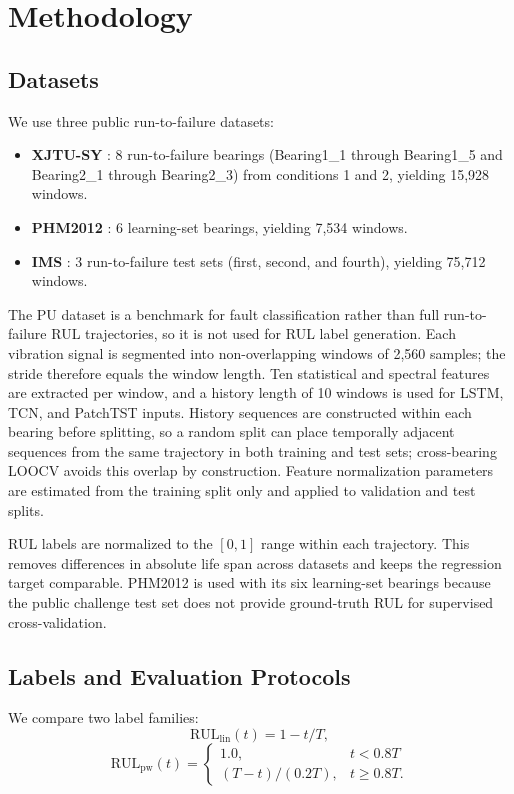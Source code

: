 \documentclass[pdflatex,sn-mathphys-num]{sn-jnl}
\begin{document}
\section{Methodology}
\subsection{Datasets}
We use three public run-to-failure datasets:
\begin{itemize}
    \item \textbf{XJTU-SY} \cite{xjtusy2019dataset}: 8 run-to-failure bearings (Bearing1\_1 through Bearing1\_5 and Bearing2\_1 through Bearing2\_3) from conditions 1 and 2, yielding 15,928 windows.
    \item \textbf{PHM2012} \cite{nectoux2012pronostia}: 6 learning-set bearings, yielding 7,534 windows.
    \item \textbf{IMS} \cite{ims2006}: 3 run-to-failure test sets (first, second, and fourth), yielding 75,712 windows.
\end{itemize}
The PU dataset is a benchmark for fault classification rather than full run-to-failure RUL trajectories, so it is not used for RUL label generation. Each vibration signal is segmented into non-overlapping windows of 2,560 samples; the stride therefore equals the window length. Ten statistical and spectral features are extracted per window, and a history length of 10 windows is used for LSTM, TCN, and PatchTST inputs. History sequences are constructed within each bearing before splitting, so a random split can place temporally adjacent sequences from the same trajectory in both training and test sets; cross-bearing LOOCV avoids this overlap by construction. Feature normalization parameters are estimated from the training split only and applied to validation and test splits.

RUL labels are normalized to the $[0,1]$ range within each trajectory. This removes differences in absolute life span across datasets and keeps the regression target comparable. PHM2012 is used with its six learning-set bearings because the public challenge test set does not provide ground-truth RUL for supervised cross-validation.

\subsection{Labels and Evaluation Protocols}
We compare two label families:
\begin{equation}
\text{RUL}_{\text{lin}}(t) = 1 - t/T,
\label{eq:linear}
\end{equation}
\begin{equation}
\text{RUL}_{\text{pw}}(t) =
\begin{cases}
1.0, & t < 0.8T \\
(T - t)/(0.2T), & t \geq 0.8T.
\end{cases}
\label{eq:piecewise}
\end{equation}
\end{document}
